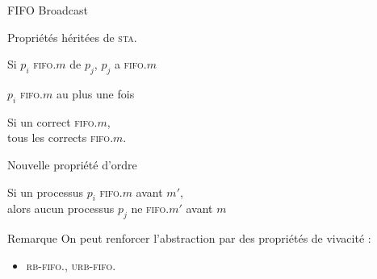 
\begingroup

\begin{frame}{FIFO Broadcast}
  
  \begin{block}{Propriétés héritées de \textsc{sta}.\Broadcast}
    \vspace{-1mm}
    \begin{description}
    \item[FIFO-Validité :]    Si $p_i$ \textsc{fifo}.\Deliver $m$ de $p_j$, $p_j$ a \textsc{fifo}.\Broadcast $m$
    \item[FIFO-Intégrité :]   $p_i$ \textsc{fifo}.\Deliver $m$ au plus une fois
    \item[FIFO-Terminaison :] Si un correct \textsc{fifo}.\Broadcast $m$, \\ tous les corrects \textsc{fifo}.\Deliver $m$.
    \end{description}
  \end{block}

  \begin{alertblock}{Nouvelle propriété d'ordre}
    \vspace{-1mm}
    \begin{description}
    \item[\alert{FIFO-Ordering :}] Si un processus $p_i$ \textsc{fifo}.\Broadcast $m$ avant $m'$, \\alors aucun processus $p_j$ ne \textsc{fifo}.\Deliver $m'$ avant $m$
    \end{description}

    \centering
  \end{alertblock}

  \vspace{-1mm}
  \begin{block}{Remarque}
    \vspace{-1mm}
    On peut renforcer l'abstraction par des propriétés de vivacité :
    \begin{itemize}
    \item \textsc{rb-fifo}.\Broadcast, \textsc{urb-fifo}.\Broadcast
    \end{itemize}
  \end{block}

  
\end{frame}

\endgroup
\endinput
